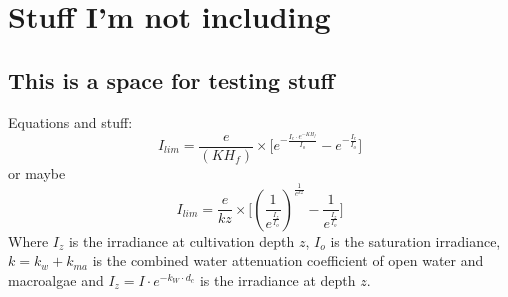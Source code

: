
\chapter{Stuff I'm not including}

\section{This is a space for testing stuff}

Equations and stuff:
%
\begin{equation}\label{2-equ:Ilim}
        I_{lim} = \frac{e}{(K H_f)} \times \Biggl[e^{- \frac{I_{c} \cdot e^{-K H_f}}{I_o}} - e^{-\frac{I_{c}}{I_o}} \Biggr]
\end{equation}
%
or maybe
%
\begin{equation}
     I_{lim} = \frac{e}{kz} \times \Biggl[ \left(\frac{1}{e^{\frac{I_z}{I_o}}}\right)^{\frac{1}{e^{kz}}} - \frac{1}{e^{\frac{I_z}{I_o}}} \Biggr]
\end{equation}
%
Where $I_z$ is the irradiance at cultivation depth $z$, $I_o$ is the saturation irradiance, $k=k_w+k_{ma}$ is the combined water attenuation coefficient of open water and macroalgae and $I_z=I \cdot e^{-k_W \cdot d_c}$ is the irradiance at depth $z$.



